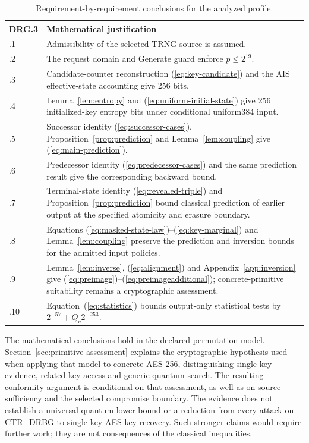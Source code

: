 \documentclass[journal=tosc,preprint,floatrow,nohyperxmp]{iacrtrans}
\numberwithin{lemma}{section}
\numberwithin{proposition}{section}
\numberwithin{equation}{section}
\theoremstyle{definition}
\numberwithin{definition}{section}
\theoremstyle{plain}
\begin{document}
\begin{table}[htbp]
\caption{Requirement-by-requirement conclusions for the analyzed profile.}\label{tab:traceability}
\centering\small
\begin{tabularx}{\linewidth}{@{}L{.105\linewidth}X@{}}
\toprule
DRG.3 & Mathematical justification\\
\midrule
.1 & Admissibility of the selected TRNG source is assumed.\\[2pt]
.2 & The request domain and Generate guard enforce $p\le2^{19}$.\\[2pt]
.3 & Candidate-counter reconstruction (\ref{eq:key-candidate}) and the AIS effective-state accounting give 256 bits.\\[2pt]
.4 & Lemma~\ref{lem:entropy} and (\ref{eq:uniform-initial-state}) give 256 initialized-key entropy bits under conditional uniform384 input.\\[2pt]
.5 & Successor identity (\ref{eq:successor-cases}), Proposition~\ref{prop:prediction} and Lemma~\ref{lem:coupling} give (\ref{eq:main-prediction}).\\[2pt]
.6 & Predecessor identity (\ref{eq:predecessor-cases}) and the same prediction result give the corresponding backward bound.\\[2pt]
.7 & Terminal-state identity (\ref{eq:revealed-triple}) and Proposition~\ref{prop:prediction} bound classical prediction of earlier output at the specified atomicity and erasure boundary.\\[2pt]
.8 & Equations (\ref{eq:masked-state-law})--(\ref{eq:key-marginal}) and Lemma~\ref{lem:coupling} preserve the prediction and inversion bounds for the admitted input policies.\\[2pt]
.9 & Lemma~\ref{lem:inverse}, (\ref{eq:alignment}) and Appendix~\ref{app:inversion} give (\ref{eq:preimage})--(\ref{eq:preimageadditional}); concrete-primitive suitability remains a cryptographic assessment.\\[2pt]
.10 & Equation~(\ref{eq:statistics}) bounds output-only statistical tests by $2^{-57}+Q_c2^{-253}$.\\
\bottomrule
\end{tabularx}
\end{table}

The mathematical conclusions hold in the declared permutation model. Section~\ref{sec:primitive-assessment} explains the cryptographic hypothesis used when applying that model to concrete AES-256, distinguishing single-key evidence, related-key access and generic quantum search. The resulting conformity argument is conditional on that assessment, as well as on source sufficiency and the selected compromise boundary. The evidence does not establish a universal quantum lower bound or a reduction from every attack on CTR\_DRBG to single-key AES key recovery. Such stronger claims would require further work; they are not consequences of the classical inequalities.
\end{document}
